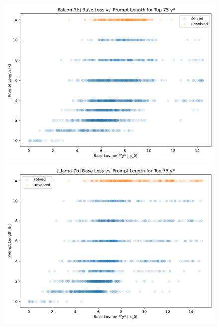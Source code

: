 \documentclass{article} %
\begin{document}
\begin{figure}[ht]
    \centering
    \begin{minipage}[b]{0.48\textwidth}
        \includegraphics[width=\textwidth]{figs/shallow1_falcon7b_base_loss_vs_prompt_length.pdf}
    \end{minipage}
    \hfill
    \begin{minipage}[b]{0.48\textwidth}
        \includegraphics[width=\textwidth]{figs/shallow1_llama7b_base_loss_vs_prompt_length.pdf}
    \end{minipage}
    
    \vspace{1em} %
    

\end{figure}
\end{document}
